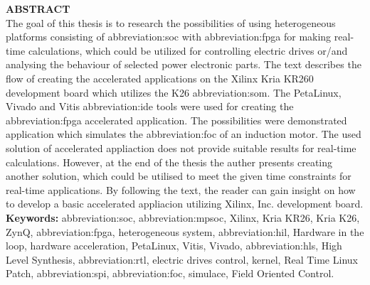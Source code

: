 \documentclass[a4paper, twoside, 11pt]{article}
\begin{document}
\begin{minipage}[t]{7.37cm}
		\textcolor{ctublue}{\Large{\textbf{\MakeTextUppercase{Abstract}}}}\\
		The goal of this thesis is to research the possibilities of using heterogeneous platforms consisting of \gls{abbreviation:soc} with \gls{abbreviation:fpga} for making real-time calculations, which could be utilized for controlling electric drives or/and analysing the behaviour of selected power electronic parts. The text describes the flow of creating the accelerated applications on the Xilinx Kria KR260 development board which utilizes the K26 \gls{abbreviation:som}. The PetaLinux, Vivado and Vitis \gls{abbreviation:ide} tools were used for creating the \gls{abbreviation:fpga} accelerated application. The possibilities were demonstrated application which simulates the \gls{abbreviation:foc} of an induction motor. The used solution of accelerated appliaction does not provide suitable results for real-time calculations. However, at the end of the thesis the auther presents creating another solution, which could be utilised to meet the given time constraints for real-time applications. By following the text, the reader can gain insight on how to develop a basic accelerated appliacion utilizing Xilinx, Inc. development board.\\
		\textbf{Keywords:} \gls{abbreviation:soc}, \gls{abbreviation:mpsoc}, Xilinx, Kria KR26, Kria K26, ZynQ, \gls{abbreviation:fpga}, heterogeneous system, \gls{abbreviation:hil}, Hardware in the loop, hardware acceleration, PetaLinux, Vitis, Vivado, \gls{abbreviation:hls}, High Level Synthesis, \gls{abbreviation:rtl}, electric drives control, kernel, Real Time Linux Patch, \gls{abbreviation:spi}, \gls{abbreviation:foc}, simulace, Field Oriented Control.
\end{minipage}


\newpage
\tableofcontents
\newpage%
\flushbottom %
\newpage
\vspace{0pt}
\listoffigures %
\flushbottom %
\newpage
\listoftables
\flushbottom
\newpage


\null\newpage
\null\newpage %
\setcounter{page}{1}
\end{document}
